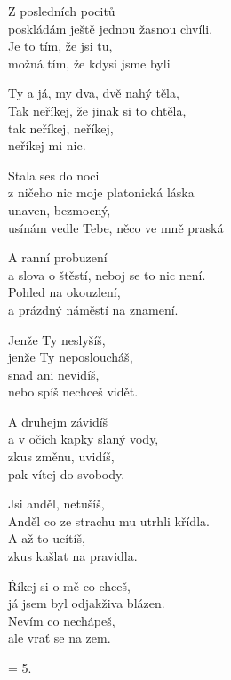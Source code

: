 
\vspace{-4.5pt}
\ve{}
Z posledních pocitů\\
poskládám ještě jednou žasnou chvíli.\\
Je to tím, že jsi tu,\\
možná tím, že kdysi jsme byli

\vspace{-4.5pt}
\ve{}
Ty a já, my dva, dvě nahý těla,\\
Tak neříkej, že jinak si to chtěla,\\
tak neříkej, neříkej,\\
neříkej mi nic.

\vspace{-4.5pt}
\ve{}
Stala ses do noci\\
z ničeho nic moje platonická láska\\
unaven, bezmocný,\\
usínám vedle Tebe, něco ve mně praská

\vspace{-4.5pt}
\ve{}
A ranní probuzení\\
a slova o štěstí, neboj se to nic není.\\
Pohled na okouzlení,\\
a prázdný náměstí na znamení.

\vspace{-4.5pt}
\cho{}
Jenže Ty neslyšíš, \\
jenže Ty neposloucháš,\\
snad ani nevidíš,\\
nebo spíš nechceš vidět.

A druhejm závidíš\\
a v očích kapky slaný vody,\\
zkus změnu, uvidíš,\\ 
pak vítej do svobody.

\vspace{-4.5pt}
\ve{}
Jsi anděl, netušíš,\\
Anděl co ze strachu mu utrhli křídla.\\
A až to ucítíš,\\
zkus kašlat na pravidla.

\vspace{-4.5pt}
\ve{}
Říkej si o mě co chceš,\\
já jsem byl odjakživa blázen.\\
Nevím co nechápeš,\\
ale vrať se na zem.

\vspace{-4.5pt}
\cho{}

\vspace{-4.5pt}
\ve{}
= 5.

\esong